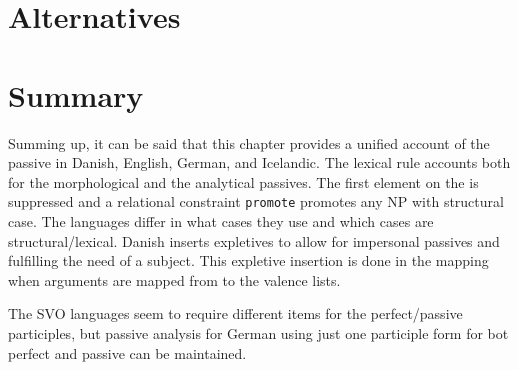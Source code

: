 



\section{Alternatives}



\section{Summary}

Summing up, it can be said that this chapter provides a unified account of the passive in Danish,
English, German, and Icelandic. The lexical rule accounts both for the morphological and the
analytical passives. The first element on the \argstl is suppressed and a relational constraint
\texttt{promote} promotes any NP with structural case. The languages differ in what cases they use and
which cases are structural/lexical. Danish inserts expletives to allow for impersonal passives and
fulfilling the need of a subject. This expletive insertion is done in the \argst mapping when
arguments are mapped from \argst to the valence lists.

The SVO languages seem to require different items for the perfect/passive participles, but 
passive analysis for German using just one participle form for bot perfect and passive can be maintained.








